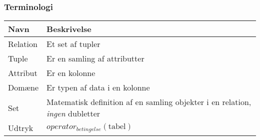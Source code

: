 \subsubsection{Terminologi}

\begin{tabu}[h]{lX}
	\toprule
	\textbf{Navn} & \textbf{Beskrivelse}\\
	\midrule
	Relation & Et set af tupler\\
	Tuple & Er en samling af attributter\\
	Attribut & Er en kolonne\\
	Domæne & Er typen af data i en kolonne\\
	Set & Matematisk definition af en samling objekter i en relation, \textit{ingen} dubletter\\
	Udtryk & $operator_{betingelse}(\text{tabel})$\\
	\bottomrule
\end{tabu}

%

%
